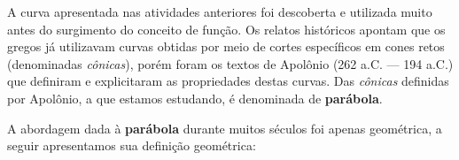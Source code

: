 \label{\detokenize{AF209-6:sec-funcao-quadratica-org-ideias-transformacoes}}\label{\detokenize{AF209-6::doc}}\label{\detokenize{AF209-6:organizando-as-ideias-os-parametros-da-forma-canonica-e-o-grafico-da-funcao-quadratica}}
A curva apresentada nas atividades anteriores foi descoberta e utilizada muito antes do surgimento do conceito de função. Os relatos históricos apontam que os gregos já utilizavam curvas obtidas por meio de cortes específicos em cones retos (denominadas \emph{cônicas}), porém foram os textos de Apolônio (262 a.C. — 194 a.C.) que definiram e explicitaram as propriedades destas curvas. Das \emph{cônicas}
definidas por Apolônio, a que estamos estudando, é denominada de \textbf{parábola}.

A abordagem dada à \textbf{parábola} durante muitos séculos foi apenas geométrica, a seguir apresentamos sua definição geométrica:

